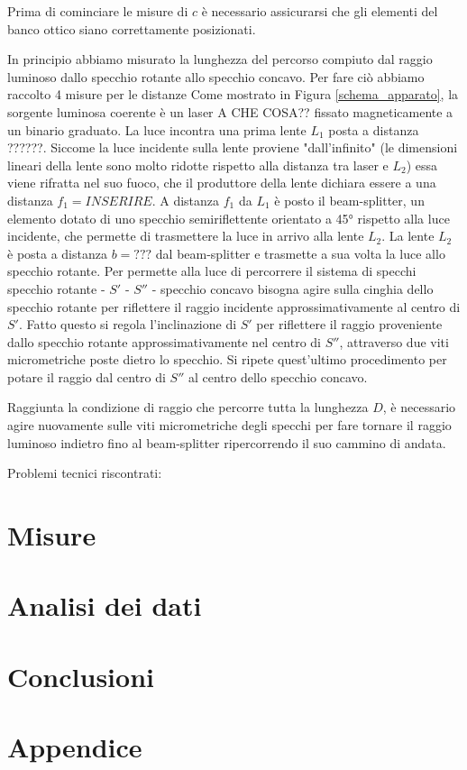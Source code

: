 \documentclass{article}
\begin{document}
Prima di cominciare le misure di $c$ è necessario assicurarsi che gli elementi del banco ottico siano correttamente posizionati.

\vspace{1mm}

In principio abbiamo misurato la lunghezza del percorso compiuto dal raggio luminoso dallo specchio rotante allo specchio concavo. Per fare ciò abbiamo raccolto 4 misure
per le distanze %
Come mostrato in Figura \ref{schema_apparato}, la sorgente luminosa coerente è un laser A CHE COSA?? fissato magneticamente a un binario graduato. La luce incontra una 
prima lente $L_1$ posta a distanza ??????. 
Siccome la luce incidente sulla lente proviene "dall'infinito" (le dimensioni lineari della lente sono molto ridotte rispetto alla distanza tra laser e $L_2$) essa viene
rifratta nel suo fuoco, che il produttore della lente dichiara essere a una distanza $f_1 = INSERIRE$. A distanza $f_1$ da $L_1$ è posto il beam-splitter, un elemento
dotato di uno specchio semiriflettente orientato a 45° rispetto alla luce incidente, che permette di trasmettere la luce in arrivo alla lente $L_2$. La lente $L_2$ 
è posta a distanza $b = ???$ dal beam-splitter e trasmette a sua volta la luce allo specchio rotante. Per permette alla luce di percorrere il sistema di specchi specchio
rotante - $S'$ - $S''$ - specchio concavo bisogna agire sulla cinghia dello specchio rotante per riflettere il raggio incidente approssimativamente al centro di $S'$.
Fatto questo si regola l'inclinazione di $S'$ per riflettere il raggio proveniente dallo specchio rotante approssimativamente nel centro di $S''$, attraverso due
viti micrometriche poste dietro lo specchio. Si ripete quest'ultimo procedimento per potare il raggio dal centro di $S''$ al centro dello specchio concavo.

\vspace{1mm}

Raggiunta la condizione di raggio che percorre tutta la lunghezza $D$, è necessario agire nuovamente sulle viti micrometriche degli specchi per fare tornare il raggio
luminoso indietro fino al beam-splitter ripercorrendo il suo cammino di andata.


Problemi tecnici riscontrati: 

\section{Misure}

\section{Analisi dei dati}

\section{Conclusioni}

\section{Appendice}
\end{document}
